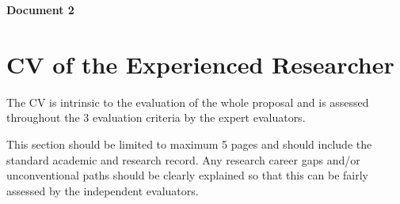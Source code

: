 \documentclass[a4paper,11pt]{article}
\newcommand{\acronym}{{\sc YourAcronym}\xspace}
\begin{document}
%
%
%      
%     
%  
%          
%
%
%
%
%

\newpage
\setcounter{section}{3}

\textbf{\LARGE{Document 2\vspace{8mm}}}

\section{CV of the Experienced Researcher}
\label{sec:cv}

The CV is intrinsic to the evaluation of the whole proposal and is assessed throughout the 3 evaluation criteria by the expert evaluators.

This section should be limited to maximum 5 pages and should include the standard academic and research record. Any research career gaps and/or unconventional paths should be clearly explained so that this can be fairly assessed by the independent evaluators.
\end{document}
